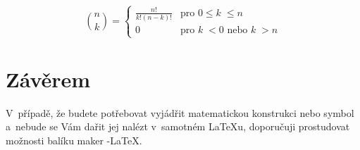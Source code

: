 \documentclass[twocolumn,a4paper,11pt]{article}
\theoremstyle{definition}
\begin{document}
$$\binom{n}{k} = \left\{
\begin{array}{ll}
\frac{n!}{k!(n-k)!} & \text{pro } 0 \leq k\;\leq n \\
0 & \text{pro } k\;< 0 \text{ nebo } k\;> n
\end{array}
\right.$$

\section{Závěrem}
V~případě, že budete potřebovat vyjádřit matematickou
konstrukci nebo symbol a~nebude se Vám dařit jej nalézt
v~samotném {\LaTeX}u, doporučuji prostudovat možnosti balíku
maker \AmS-\LaTeX.
\end{document}
